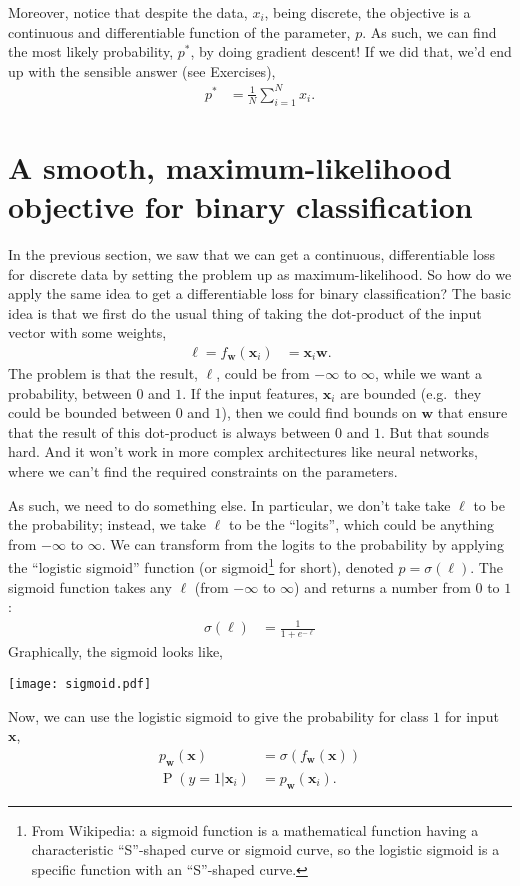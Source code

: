 \documentclass{article}
\newcommand{\bracket}[3]{\left#1 #3 \right#2}
\renewcommand{\b}{\bracket{(}{)}}
\newcommand{\x}{\mathbf{x}}
\renewcommand{\P}{\operatorname{P}\b}
\newcommand{\w}{\mathbf{w}}
\newcommand{\logits}{\ell}
\begin{document}
Moreover, notice that despite the data, $x_i$, being discrete, the objective is a continuous and differentiable function of the parameter, $p$. 
As such, we can find the most likely probability, $p^*$, by doing gradient descent!
If we did that, we'd end up with the sensible answer (see Exercises),
\begin{align}
  p^* &= \tfrac{1}{N} \sum_{i=1}^N x_i.
\end{align}


\section{A smooth, maximum-likelihood objective for binary classification}
\label{sec:binary_obj}
In the previous section, we saw that we can get a continuous, differentiable loss for discrete data by setting the problem up as maximum-likelihood.
So how do we apply the same idea to get a differentiable loss for binary classification?
The basic idea is that we first do the usual thing of taking the dot-product of the input vector with some weights,
\begin{align}
  \logits = f_\w(\x_i) &= \x_i \w.
\end{align}
The problem is that the result, $\logits$, could be from $-\infty$ to $\infty$, while we want a probability, between $0$ and $1$.
If the input features, $\x_i$ are bounded (e.g.\ they could be bounded between $0$ and $1$), then we could find bounds on $\w$ that ensure that the result of this dot-product is always between $0$ and $1$.
But that sounds hard.
And it won't work in more complex architectures like neural networks, where we can't find the required constraints on the parameters.

As such, we need to do something else. 
In particular, we don't take take $\logits$ to be the probability; instead, we take $\logits$ to be the ``logits'', which could be anything from $-\infty$ to $\infty$.
We can transform from the logits to the probability by applying the ``logistic sigmoid'' function (or sigmoid\footnote{From Wikipedia: a sigmoid function is a mathematical function having a characteristic ``S''-shaped curve or sigmoid curve, so the logistic sigmoid is a specific function with an ``S''-shaped curve.} for short), denoted $p = \sigma(\logits)$.
The sigmoid function takes any $\logits$ (from $-\infty$ to $\infty$) and returns a number from $0$ to $1$:
\begin{align}
  \sigma(\logits) &= \frac{1}{1+e^{-\logits}}
\end{align}
Graphically, the sigmoid looks like,
\begin{center}
  \texttt{[image: sigmoid.pdf]}
\end{center}
Now, we can use the logistic sigmoid to give the probability for class $1$ for input $\x$,
\begin{align}
  \label{eq:sigmoid_prob}
  p_\w(\x) &= \sigma(f_\w(\x))\\
  \P{y=1| \x_i} &= p_\w(\x_i).
\end{align}
\end{document}
